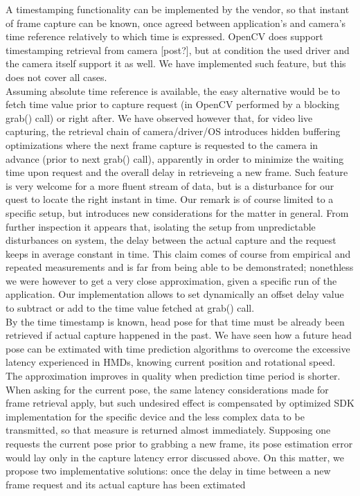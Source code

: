 A timestamping functionality can be implemented by the vendor, so that instant of frame capture can be known, once agreed between application's and camera's time reference relatively to which time is expressed. OpenCV does support timestamping retrieval from camera [post?], but at condition the used driver and the camera itself support it as well. We have implemented such feature, but this does not cover all cases.\\
Assuming absolute time reference is available, the easy alternative would be to fetch time value prior to capture request (in OpenCV performed by a blocking grab() call) or right after. We have observed however that, for video live capturing, the retrieval chain of camera/driver/OS introduces hidden buffering optimizations where the next frame capture is requested to the camera in advance (prior to next grab() call), apparently in order to minimize the waiting time upon request and the overall delay in retrieveing a new frame. Such feature is very welcome for a more fluent stream of data, but is a disturbance for our quest to locate the right instant in time. Our remark is of course limited to a specific setup, but introduces new considerations for the matter in general. From further inspection it appears that, isolating the setup from unpredictable disturbances on system, the delay between the actual capture and the request keeps in average constant in time. This claim comes of course from empirical and repeated measurements and is far from being able to be demonstrated; nonethless we were however to get a very close approximation, given a specific run of the application. Our implementation allows to set dynamically an offset delay value to subtract or add to the time value fetched at grab() call.\\
By the time timestamp is known, head pose for that time must be already been retrieved if actual capture happened in the past. We have seen how a future head pose can be extimated with time prediction algorithms to overcome the excessive latency experienced in HMDs, knowing current position and rotational speed. The approximation improves in quality when prediction time period is shorter. When asking for the current pose, the same latency considerations made for frame retrieval apply, but such undesired effect is compensated by optimized SDK implementation for the specific device and the less complex data to be transmitted, so that measure is returned almost immediately. Supposing one requests the current pose prior to grabbing a new frame, its pose estimation error would lay only in the capture latency error discussed above. On this matter, we propose two implementative solutions: once the delay in time between a new frame request and its actual capture has been extimated
